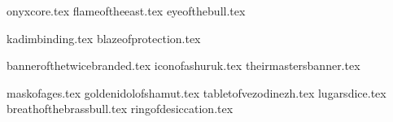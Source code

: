 

\raggedcolumns
\begin{multicols}{2}

\subtitle{\weaponenchantments}
\startsortedpricelist

{onyxcore.tex}
{flameoftheeast.tex}
{eyeofthebull.tex}
\endsortedpricelist

\subtitle{\armourenchantments}
\startsortedpricelist


{kadimbinding.tex}
{blazeofprotection.tex}

\endsortedpricelist

\subtitle{\bannerenchantments}
\startsortedpricelist

{bannerofthetwicebranded.tex}
{iconofashuruk.tex}
{theirmastersbanner.tex}
\endsortedpricelist

\subtitle{\artefacts}
\startsortedpricelist

{maskofages.tex}
{goldenidolofshamut.tex}
{tabletofvezodinezh.tex}
{lugarsdice.tex}
{breathofthebrassbull.tex}
{ringofdesiccation.tex}

\endsortedpricelist
\end{multicols}
